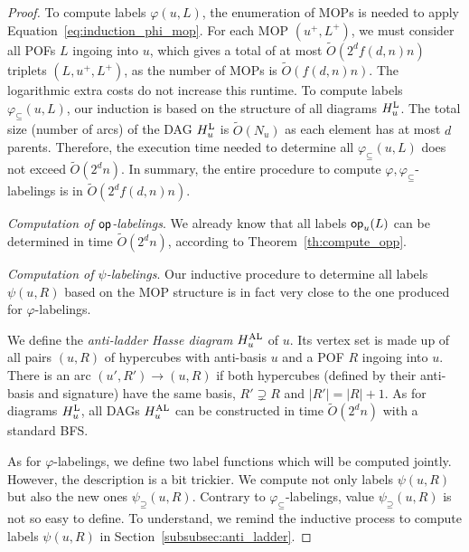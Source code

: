 \documentclass[a4paper,UKenglish,numberwithinsect,cleveref, autoref,anonymous]{lipics-v2021}
\newcommand{\card}[1]{\left| #1 \right|}
\newcommand{\opp}{\mbox{\textsf{op}}}
\newcommand{\hul}{H_u^{\mbox{\scriptsize{L}}}}
\newcommand{\hual}{H_u^{\mbox{\scriptsize{AL}}}}
\newcommand{\varphis}{\varphi_{\subseteq}}
\newcommand{\psis}{\psi_{\supseteq}}
\begin{document}
\begin{proof}
To compute labels $\varphi(u,L)$, the enumeration of MOPs is needed to apply Equation~\eqref{eq:induction_phi_mop}. For each MOP $(u^+,L^+)$, we must consider all POFs $L$ ingoing into $u$, which gives a total of at most $\tilde{O}(2^df(d,n)n)$ triplets $(L,u^+,L^+)$, as the number of MOPs is $\tilde{O}(f(d,n)n)$. The logarithmic extra costs do not increase this runtime. To compute labels $\varphis(u,L)$, our induction is based on the structure of all diagrams $\hul$. The total size (number of arcs) of the DAG $\hul$ is $\tilde{O}(N_u)$ as each element has at most $d$ parents. Therefore, the execution time needed to determine all $\varphis(u,L)$ does not exceed $\tilde{O}(2^dn)$. In summary, the entire procedure to compute $\varphi,\varphis$-labelings is in $\tilde{O}(2^df(d,n)n)$.

\textit{Computation of $\opp$-labelings}. We already know that all labels $\opp_u(L)$ can be determined in time $\tilde{O}(2^dn)$, according to Theorem~\ref{th:compute_opp}.

\textit{Computation of $\psi$-labelings}. Our inductive procedure to determine all labels $\psi(u,R)$ based on the MOP structure is in fact very close to the one produced for $\varphi$-labelings.

We define the \textit{anti-ladder Hasse diagram} $\hual$ of $u$. Its vertex set is made up of all pairs $(u,R)$ of hypercubes with anti-basis $u$ and a POF $R$ ingoing into $u$. There is an arc $(u',R')\rightarrow (u,R)$ if both hypercubes (defined by their anti-basis and signature) have the same basis, $R' \supsetneq R$ and $\card{R'} = \card{R} + 1$. As for diagrams $\hul$, all DAGs $\hual$ can be constructed in time $\tilde{O}(2^dn)$ with a standard BFS.

As for $\varphi$-labelings, we define two label functions which will be computed jointly. However, the description is a bit trickier. We compute not only labels $\psi(u,R)$ but also the new ones $\psis(u,R)$. Contrary to $\varphis$-labelings, value $\psis(u,R)$ is not so easy to define. To understand, we remind the inductive process to compute labels $\psi(u,R)$ in Section~\ref{subsubsec:anti_ladder}.


\end{proof}
\end{document}

